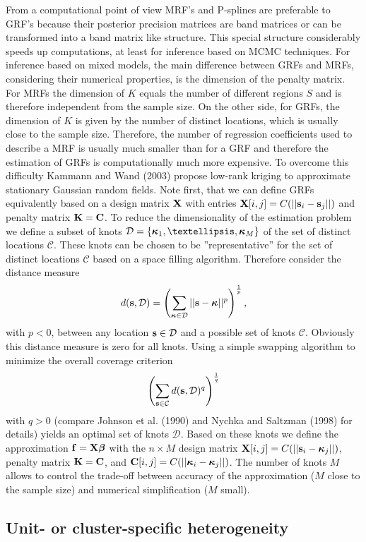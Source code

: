 \documentclass[11pt,a4paper,twoside]{bayesxarticle}
\begin{document}
From a computational point of view MRF's and P-splines are
preferable to GRF's because their posterior precision matrices are
band matrices or can be transformed into a band matrix like
structure. This special structure considerably speeds up
computations, at least for inference based on MCMC techniques. For
inference based on mixed models, the main difference between GRFs
and MRFs, considering their numerical properties, is the dimension
of the penalty matrix. For MRFs the dimension of $K$ equals the
number of different regions $S$ and is therefore independent from
the sample size. On the other side, for GRFs, the dimension of $K$
is given by the number of distinct locations, which is usually close
to the sample size. Therefore, the number of regression coefficients
used to describe a MRF is usually much smaller than for a GRF and
therefore the estimation of GRFs is computationally much more
expensive. To overcome this difficulty Kammann and Wand (2003)
propose low-rank kriging to approximate stationary Gaussian random
fields. Note first, that we can define GRFs equivalently based on a
design matrix $\mathbf{X}$ with entries
$\mathbf{X}[i,j]=C(||\mathbf{s}_i-\mathbf{s}_j||)$ and penalty matrix
$\mathbf{K}=\mathbf{C}$. To reduce the dimensionality of the estimation
problem we define a subset of knots
$\mathcal{D}=\{\kappavec_1,\ldots,\kappavec_M\}$ of the set of
distinct locations $\mathcal{C}$. These knots can be chosen to be
''representative'' for the set of distinct locations $\mathcal{C}$
based on a space filling algorithm. Therefore consider the distance
measure
\[d(\mathbf{s},\mathcal{D})=\left(\sum_{\boldsymbol{\kappa}\in\mathcal{D}}||\mathbf{s}-\boldsymbol{\kappa}||^p\right)^{\frac{1}{p}},\]
with $p<0$, between any location $\mathbf{s}\in\mathcal{D}$ and a
possible set of knots $\mathcal{C}$. Obviously this distance measure
is zero for all knots. Using a simple swapping algorithm to minimize
the overall coverage criterion
\[\left(\sum_{\mathbf{s}\in\mathcal{C}}d(\mathbf{s},\mathcal{D})^q\right)^{\frac{1}{q}}\]
with $q>0$ (compare Johnson et al. (1990) and Nychka and Saltzman
(1998) for details) yields an optimal set of knots $\mathcal{D}$.
Based on these knots we define the approximation
$\mathbf{f}=\mathbf{X}\boldsymbol{\beta}$ with the $n\times M$ design matrix
$\mathbf{X}[i,j]=C(||\mathbf{s}_i-\boldsymbol{\kappa}_j||)$, penalty matrix
$\mathbf{K}=\mathbf{C}$, and $\mathbf{C}[i,j]=C(||\boldsymbol{\kappa}_i-\boldsymbol{\kappa}_j||)$. The
number of knots $M$ allows to control the trade-off between accuracy
of the approximation ($M$ close to the sample size) and numerical
simplification ($M$ small).

\subsection{Unit- or cluster-specific heterogeneity}
\label{random}
\end{document}
